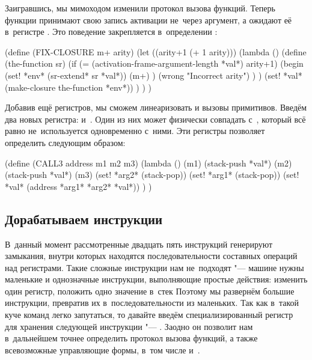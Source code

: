 Заигравшись, мы мимоходом изменили протокол вызова функций. Теперь функции
принимают свою запись активации не~через аргумент, а ожидают её в~регистре
. Это поведение закрепляется в~определении :

\begin{code:lisp}
(define (FIX-CLOSURE m+ arity)
  (let ((arity+1 (+ 1 arity)))
    (lambda ()
      (define (the-function sr)
        (if (= (activation-frame-argument-length *val*) arity+1)
            (begin (set! *env* (sr-extend* sr *val*))
                   (m+) )
            (wrong "Incorrect arity") ) )
      (set! *val* (make-closure the-function *env*)) ) ) )
\end{code:lisp}

Добавив ещё регистров, мы сможем линеаризовать и вызовы примитивов. Введём два
новых регистра:  и~. Один из них может физически совпадать
с~, который всё равно не~используется одновременно с~ними. Эти
регистры позволяет определить  следующим образом:

\begin{code:lisp}
(define (CALL3 address m1 m2 m3)
  (lambda ()
    (m1)
    (stack-push *val*)
    (m2)
    (stack-push *val*)
    (m3)
    (set! *arg2* (stack-pop))
    (set! *arg1* (stack-pop))
    (set! *val* (address *arg1* *arg2* *val*)) ) )
\end{code:lisp}


\subsection{Дорабатываем инструкции}\label{compilation/bytes/ssect:customize}

В~данный момент рассмотренные двадцать пять инструкций генерируют замыкания,
внутри которых находятся последовательности составных операций над регистрами.
Такие сложные инструкции нам не~подходят "--- машине нужны маленькие и
однозначные инструкции, выполняющие простые действия: изменить один регистр,
положить одно значение в~стек {\itp} Поэтому мы развернём большие инструкции,
превратив их в~последовательности из маленьких. Так как в~такой куче команд
легко запутаться, то давайте введём специализированный регистр для хранения
следующей инструкции  "--- . Заодно он позволит нам
в~дальнейшем точнее определить протокол вызова функций, а также всевозможные
управляющие формы, в~том числе и~.


